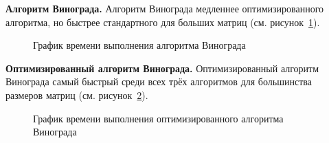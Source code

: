 \textbf{Алгоритм Винограда.}  
Алгоритм Винограда медленнее оптимизированного алгоритма, но быстрее стандартного для больших матриц (см. рисунок~\ref{pic_vinograd}).

\begin{figure}[H]
	\caption{График времени выполнения алгоритма Винограда}
	\label{pic_vinograd}
\end{figure}

\textbf{Оптимизированный алгоритм Винограда.}  
Оптимизированный алгоритм Винограда самый быстрый среди всех трёх алгоритмов для большинства размеров матриц (см. рисунок~\ref{pic_vinograd_opt}).

\begin{figure}[H]
	\caption{График времени выполнения оптимизированного алгоритма Винограда}
	\label{pic_vinograd_opt}
\end{figure}

